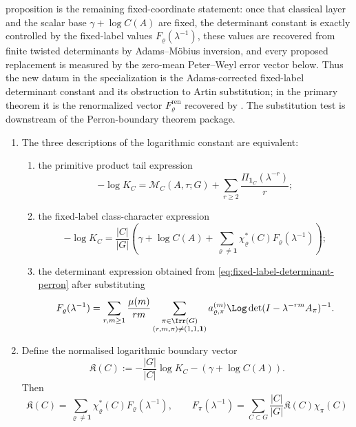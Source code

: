 \begin{remark}
  proposition is the remaining fixed-coordinate statement: once that classical
  layer and the scalar base \(\gamma+\log C(A)\) are fixed, the determinant
  constant is exactly controlled by the fixed-label values
  \(F_\varrho(\lambda^{-1})\), these values are recovered from finite twisted
  determinants by Adams--M\"obius inversion, and every proposed replacement is
  measured by the zero-mean Peter--Weyl error vector below.  Thus the new
  datum in the specialization is the Adams-corrected fixed-label determinant
  constant and its obstruction to Artin substitution; in the primary theorem
  it is the renormalized vector \(F_\varrho^{\mathrm{ren}}\) recovered by
  .  The substitution test is
  downstream of the Perron-boundary theorem package.
  \begin{enumerate}[label=\textup{(\Alph*)}]
    \item The three descriptions of the logarithmic constant are equivalent:
  \begin{enumerate}[label=\textup{(\roman*)}]
    \item the primitive product tail expression
    \[
      -\log K_C=
      \mathcal M_C(A,\tau;G)
      +\sum_{r\ge2}\frac{\Pi_{\mathbf1_C}(\lambda^{-r})}{r};
    \]
    \item the fixed-label class-character expression
    \[
      -\log K_C=
      \frac{|C|}{|G|}
      \left(
        \gamma+\log C(A)
        +\sum_{\varrho\neq\mathbf1}
          \chi_\varrho^\ast(C)F_\varrho(\lambda^{-1})
      \right);
    \]
    \item the determinant expression obtained from
    \eqref{eq:fixed-label-determinant-perron} after substituting
    \[
      F_\varrho(\lambda^{-1})
      =
      \sum_{r,m\ge1}\frac{\mu(m)}{rm}
        \sum_{\substack{\pi\in\Irr(G)\\(r,m,\pi)\ne(1,1,\mathbf1)}}
          a_{\varrho,\pi}^{(m)}
          \Log\det(I-\lambda^{-rm}A_\pi)^{-1}.
      \]
    \end{enumerate}
    \item Define the normalised logarithmic boundary vector
    \[
      \mathfrak K(C)
      :=-
      \frac{|G|}{|C|}\log K_C-(\gamma+\log C(A)).
    \]
    Then
    \begin{equation}\label{eq:comparison-fixed-label-inverse}
      \mathfrak K(C)=
      \sum_{\varrho\ne\mathbf1}
        \chi_\varrho^\ast(C)F_\varrho(\lambda^{-1}),
      \qquad
      F_\pi(\lambda^{-1})=
      \sum_{C\subset G}\frac{|C|}{|G|}\mathfrak K(C)\chi_\pi(C)
    \end{equation}

\end{enumerate}
\end{remark}
